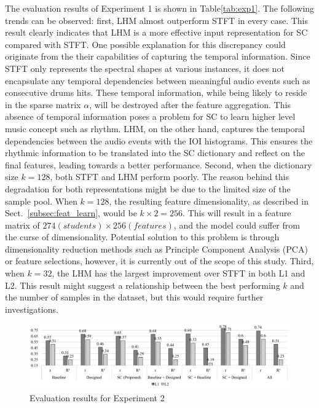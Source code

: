 \documentclass{article}
\begin{document}
The evaluation results of Experiment 1 is shown in Table\ref{tab:exp1}. The following trends can be observed: first, LHM almost outperform STFT in every case. This result clearly indicates that LHM is a more effective input representation for SC compared with STFT. One possible explanation for this discrepancy could originate from the their capabilities of capturing the temporal information. Since STFT only represents the spectral shapes at various instances, it does not encapsulate any temporal dependencies between meaningful audio events such as consecutive drums hits. These temporal information, while being likely to reside in the sparse matrix $\alpha$, will be destroyed after the feature aggregation. This absence of temporal information poses a problem for SC to learn higher level music concept such as rhythm. LHM, on the other hand, captures the temporal dependencies between the audio events with the IOI histograms. This ensures the rhythmic information to be translated into the SC dictionary and reflect on the final features, leading towards a better performance. Second, when the dictionary size $k = 128$, both STFT and LHM perform poorly. The reason behind this degradation for both representations might be due to the limited size of the sample pool. When $k = 128$, the resulting feature dimensionality, as described in Sect.~\ref{subsec:feat_learn}, would be $k \times 2 = 256$. This will result in a feature matrix of $274 (students) \times 256 (features)$, and the model could suffer from the curse of dimensionality. Potential solution to this problem is through dimensionality reduction methods such as Principle Component Analysis (PCA) or feature selections, however, it is currently out of the scope of this study. Third, when $k = 32$, the LHM has the largest improvement over STFT in both L1 and L2. This result might suggest a relationship between the best performing $k$ and the number of samples in the dataset, but this would require further investigations. 


\begin{figure}
\centering
\includegraphics[width = 17.2 cm]{./figs/exp2.pdf}
\caption{Evaluation results for Experiment 2}
\label{fig:exp2}
\end{figure}
\end{document}
